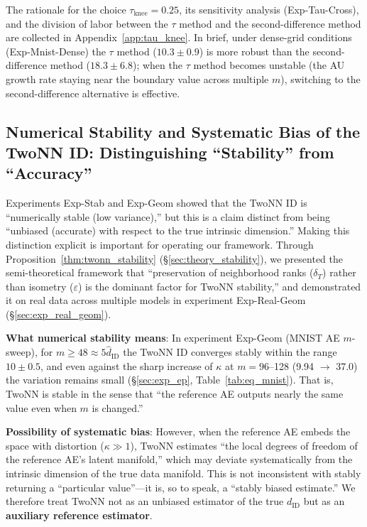 \documentclass[make,article,submit,pdftex,moreauthors]{Definitions/mdpi}
\begin{document}
The rationale for the choice $\tau_{\mathrm{knee}} = 0.25$, its sensitivity analysis
(Exp-Tau-Cross), and the division of labor between the $\tau$ method and the
second-difference method are collected in Appendix~\ref{app:tau_knee}.
In brief, under dense-grid conditions (Exp-Mnist-Dense) the $\tau$ method
($10.3 \pm 0.9$) is more robust than the second-difference method
($18.3 \pm 6.8$); when the $\tau$ method becomes unstable (the AU growth rate
staying near the boundary value across multiple $m$), switching to the
second-difference alternative is effective.

\subsection{Numerical Stability and Systematic Bias of the TwoNN ID: Distinguishing ``Stability'' from ``Accuracy''}\label{sec:disc_twonn_bias}

Experiments Exp-Stab and Exp-Geom showed that the TwoNN ID is ``numerically stable
(low variance),'' but this is a claim distinct from being ``unbiased (accurate) with
respect to the true intrinsic dimension.''
Making this distinction explicit is important for operating our framework.
Through Proposition~\ref{thm:twonn_stability} (\S\ref{sec:theory_stability}), we
presented the semi-theoretical framework that ``preservation of neighborhood ranks
($\delta_T$) rather than isometry ($\varepsilon$) is the dominant factor for TwoNN
stability,'' and demonstrated it on real data across multiple models in experiment
Exp-Real-Geom (\S\ref{sec:exp_real_geom}).

\textbf{What numerical stability means}:
In experiment Exp-Geom (MNIST AE $m$-sweep), for $m \geq 48 \approx 5\hat{d}_\mathrm{ID}$
the TwoNN ID converges stably within the range $10 \pm 0.5$, and even against the sharp
increase of $\kappa$ at $m = 96$--128 (9.94 $\to$ 37.0) the variation remains small
(\S\ref{sec:exp_ep}, Table~\ref{tab:eq_mnist}).
That is, TwoNN is stable in the sense that ``the reference AE outputs nearly the same
value even when $m$ is changed.''

\textbf{Possibility of systematic bias}:
However, when the reference AE embeds the space with distortion ($\kappa \gg 1$),
TwoNN estimates ``the local degrees of freedom of the reference AE's latent manifold,''
which may deviate systematically from the intrinsic dimension of the true data manifold.
This is not inconsistent with stably returning a ``particular value''---it is, so to
speak, a ``stably biased estimate.''
We therefore treat TwoNN not as an unbiased estimator of the true $d_\mathrm{ID}$ but as
an \textbf{auxiliary reference estimator}.
\end{document}
